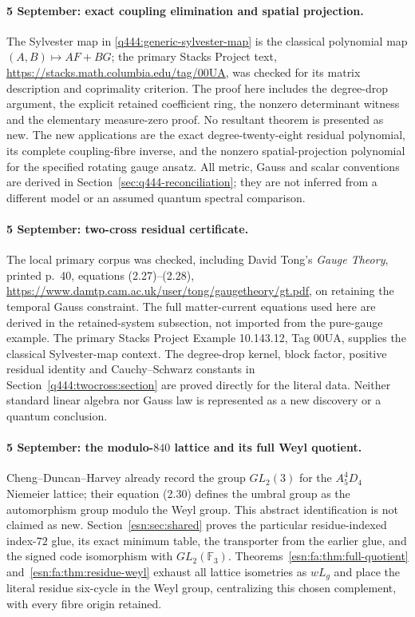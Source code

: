 \paragraph{5 September: exact coupling elimination and spatial projection.}
The Sylvester map in
\eqref{q444:generic-sylvester-map} is the classical polynomial map
$(A,B)\mapsto AF+BG$; the primary Stacks Project text,
\url{https://stacks.math.columbia.edu/tag/00UA}, was checked for its
matrix description and coprimality criterion. The proof here includes
the degree-drop argument, the explicit retained coefficient ring,
the nonzero determinant witness and the elementary measure-zero proof.
No resultant theorem is presented as new. The new applications are
the exact degree-twenty-eight residual polynomial, its complete
coupling-fibre inverse, and the nonzero spatial-projection polynomial
for the specified rotating gauge ansatz. All metric, Gauss and scalar
conventions are derived in Section~\ref{sec:q444-reconciliation};
they are not inferred from a different model or an assumed quantum
spectral comparison.

\paragraph{5 September: two-cross residual certificate.}
The local primary corpus was checked, including David Tong's
\emph{Gauge Theory}, printed p.~40, equations (2.27)--(2.28),
\url{https://www.damtp.cam.ac.uk/user/tong/gaugetheory/gt.pdf},
on retaining the temporal Gauss constraint. The full matter-current
equations used here are derived in the retained-system subsection, not
imported from the pure-gauge example. The primary Stacks Project
Example 10.143.12, Tag 00UA, supplies the classical Sylvester-map
context. The degree-drop kernel, block factor, positive residual identity
and Cauchy--Schwarz constants in Section~\ref{q444:twocross:section}
are proved directly for the literal data. Neither standard linear algebra
nor Gauss law is represented as a new discovery or a quantum conclusion.

\paragraph{5 September: the modulo-$840$ lattice and its full Weyl quotient.}
Cheng--Duncan--Harvey \cite[Table~3, arXiv p.~21]{esn:CDH2014}
already record the group $GL_2(3)$ for the $A_5^4D_4$ Niemeier lattice;
their equation (2.30) defines the umbral group as the automorphism group
modulo the Weyl group. This abstract identification is not claimed as new.
Section~\ref{esn:sec:shared} proves the particular residue-indexed
index-$72$ glue, its exact minimum table, the transporter from the earlier
glue, and the signed code isomorphism with $GL_2(\mathbb F_3)$.
Theorems~\ref{esn:fa:thm:full-quotient}
and~\ref{esn:fa:thm:residue-weyl} exhaust all lattice isometries as
$wL_g$ and place the literal residue six-cycle in the Weyl group,
centralizing this chosen complement, with every fibre origin retained.

